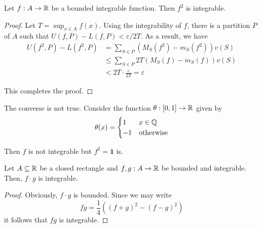 \begin{lemma}
    Let $f:A\to\mathbb{R}$ be a bounded integrable function. Then $f^2$ is integrable.
\end{lemma}
\begin{proof}
    Let $T = \sup_{x\in A}f(x)$. Using the integrability of $f$, there is a partition $P$ of $A$ such that $U(f,P) - L(f,P) < \varepsilon/2T$. As a result, we have 
    \begin{align*}
        U(f^2, P) - L(f^2, P) &= \sum_{S\in P}(M_S(f^2) - m_S(f^2))v(S)\\
        &\le\sum_{S\in P}2T(M_S(f) - m_S(f))v(S)\\
        &<2T\cdot\frac{\varepsilon}{2T} = \varepsilon
    \end{align*}

    This completes the proof.
\end{proof}

The converse is not true. Consider the function $\theta:[0,1]\to\mathbb{R}$ given by
\begin{equation*}
    \theta(x) = 
    \begin{cases}
        1 & x\in\mathbb{Q}\\
        -1 & \text{otherwise}
    \end{cases}
\end{equation*}

Then $f$ is not integrable but $f^2 = \mathbf{1}$ is.

\begin{proposition}
    Let $A\subseteq\mathbb{R}$ be a closed rectangle and $f,g:A\to\mathbb{R}$ be bounded and integrable. Then, $f\cdot g$ is integrable.
\end{proposition}
\begin{proof}
    Obviously, $f\cdot g$ is bounded. Since we may write 
    \begin{equation*}
        fg = \frac{1}{4}\left((f + g)^2 - (f - g)^2\right)
    \end{equation*}
    it follows that $fg$ is integrable.
\end{proof}

\hrulefill


